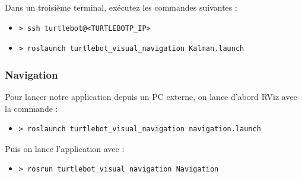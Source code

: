 \documentclass[10pt,a4paper]{article}
\begin{document}
Dans un troisième terminal, exécutez les commandes suivantes :

\begin{itemize}
\item[]  \begin{verbatim}> ssh turtlebot@<TURTLEBOTP_IP> \end{verbatim}
\item[]  \begin{verbatim}> roslaunch turtlebot_visual_navigation Kalman.launch \end{verbatim}
\end{itemize}

\subsubsection{Navigation}

Pour lancer notre application depuis un PC externe, on lance d'abord RViz avec la commande :
\begin{itemize}
\item[]  \begin{verbatim}> roslaunch turtlebot_visual_navigation navigation.launch \end{verbatim}
\end{itemize}

Puis on lance l'application avec :
\begin{itemize}
\item[]  \begin{verbatim}> rosrun turtlebot_visual_navigation Navigation \end{verbatim}
\end{itemize}

\end{document}
